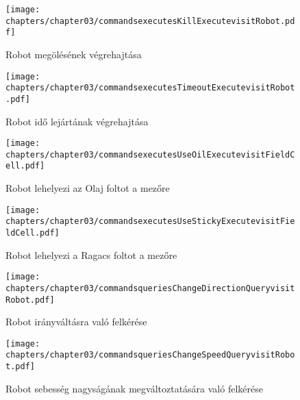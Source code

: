\begin{figure}[h]
	\begin{center}
		\texttt{[image: chapters/chapter03/commandsexecutesKillExecutevisitRobot.pdf]}
		\caption{Robot megölésének végrehajtása}
		\label{fig:command.executes.KillExecute.visit}
	\end{center}
\end{figure}

\begin{figure}[h]
	\begin{center}
		\texttt{[image: chapters/chapter03/commandsexecutesTimeoutExecutevisitRobot.pdf]}
		\caption{Robot idő lejártának végrehajtása}
		\label{fig:command.executes.TimeoutExecute.visit}
	\end{center}
\end{figure}

\begin{figure}[h]
	\begin{center}
		\texttt{[image: chapters/chapter03/commandsexecutesUseOilExecutevisitFieldCell.pdf]}
		\caption{Robot lehelyezi az Olaj foltot a mezőre}
		\label{fig:command.executes.UseOilExecute.visit}
	\end{center}
\end{figure}

\begin{figure}[h]
	\begin{center}
		\texttt{[image: chapters/chapter03/commandsexecutesUseStickyExecutevisitFieldCell.pdf]}
		\caption{Robot lehelyezi a Ragacs foltot a mezőre}
		\label{fig:command.executes.UseStickyExecute.visit}
	\end{center}
\end{figure}

\clearpage

\begin{figure}[h]
	\begin{center}
		\texttt{[image: chapters/chapter03/commandsqueriesChangeDirectionQueryvisitRobot.pdf]}
		\caption{Robot irányváltásra való felkérése}
		\label{fig:command.executes.ChangeDirectionQuery.visit}
	\end{center}
\end{figure}

\begin{figure}[h]
	\begin{center}
		\texttt{[image: chapters/chapter03/commandsqueriesChangeSpeedQueryvisitRobot.pdf]}
		\caption{Robot sebesség nagyságának megváltoztatására való felkérése}
		\label{fig:command.executes.ChangeSpeedQuery.visit}
	\end{center}
\end{figure}

